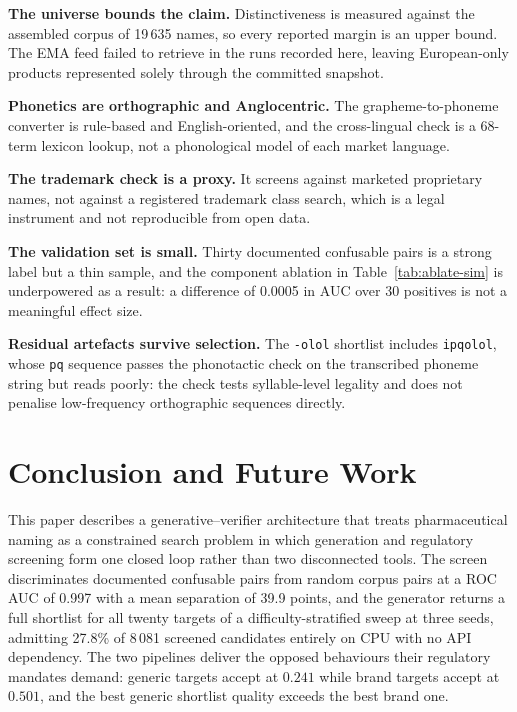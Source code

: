 \documentclass[conference]{IEEEtran}
\newcommand{\code}[1]{\texttt{\footnotesize #1}}
\begin{document}
\textbf{The universe bounds the claim.} Distinctiveness is measured against the
assembled corpus of 19\,635 names, so every reported margin is an upper bound.
The EMA feed failed to retrieve in the runs recorded here, leaving European-only
products represented solely through the committed snapshot.

\textbf{Phonetics are orthographic and Anglocentric.} The grapheme-to-phoneme
converter is rule-based and English-oriented, and the cross-lingual check is a
68-term lexicon lookup, not a phonological model of each market language.

\textbf{The trademark check is a proxy.} It screens against marketed proprietary
names, not against a registered trademark class search, which is a legal
instrument and not reproducible from open data.

\textbf{The validation set is small.} Thirty documented confusable pairs is a
strong label but a thin sample, and the component ablation in
Table~\ref{tab:ablate-sim} is underpowered as a result: a difference of 0.0005 in
AUC over 30 positives is not a meaningful effect size.

\textbf{Residual artefacts survive selection.} The \code{-olol} shortlist
includes \code{ipqolol}, whose \code{pq} sequence passes the phonotactic check on
the transcribed phoneme string but reads poorly: the check tests syllable-level
legality and does not penalise low-frequency orthographic sequences directly.

\section{Conclusion and Future Work}

This paper describes a generative--verifier architecture that treats
pharmaceutical naming as a constrained search problem in which generation and
regulatory screening form one closed loop rather than two disconnected tools.
The screen discriminates documented confusable pairs from random corpus pairs at
a ROC AUC of 0.997 with a mean separation of 39.9 points, and the generator
returns a full shortlist for all twenty targets of a difficulty-stratified sweep
at three seeds, admitting 27.8\% of 8\,081 screened candidates entirely on CPU
with no API dependency. The two pipelines deliver the opposed behaviours their
regulatory mandates demand: generic targets accept at $0.241$ while brand
targets accept at $0.501$, and the best generic shortlist quality exceeds the
best brand one.
\end{document}
